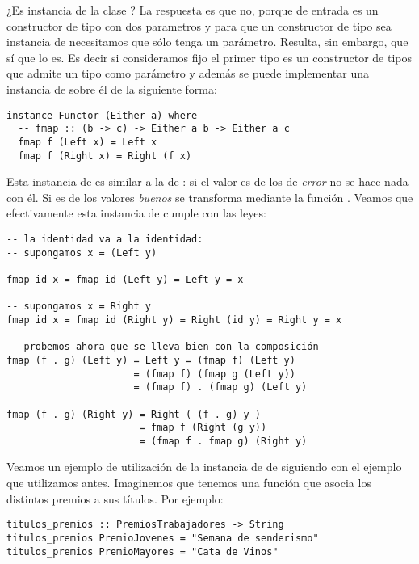 ¿Es  instancia de la clase ?
La respuesta es que no, porque de entrada
 es un constructor de tipo con dos parametros y para que
un constructor de tipo sea instancia
de  necesitamos que sólo tenga
un parámetro. Resulta, sin embargo, que
 sí que lo es. Es decir si consideramos fijo el primer tipo
 es un constructor de tipos que admite un tipo
como parámetro y además se puede implementar una instancia de
 sobre él de la siguiente forma:

\begin{verbatim}
instance Functor (Either a) where
  -- fmap :: (b -> c) -> Either a b -> Either a c
  fmap f (Left x) = Left x
  fmap f (Right x) = Right (f x)
\end{verbatim}

Esta instancia de  es similar a la de :
si el valor
es de los de \emph{error} no se hace nada con él.
Si es de los valores
\emph{buenos} se transforma mediante la
función . Veamos que efectivamente
esta instancia de  cumple con las leyes:
\begin{verbatim}
-- la identidad va a la identidad:
-- supongamos x = (Left y)

fmap id x = fmap id (Left y) = Left y = x

-- supongamos x = Right y
fmap id x = fmap id (Right y) = Right (id y) = Right y = x

-- probemos ahora que se lleva bien con la composición
fmap (f . g) (Left y) = Left y = (fmap f) (Left y)
                      = (fmap f) (fmap g (Left y))
                      = (fmap f) . (fmap g) (Left y)

fmap (f . g) (Right y) = Right ( (f . g) y )
                       = fmap f (Right (g y))
                       = (fmap f . fmap g) (Right y)
\end{verbatim}

Veamos un ejemplo de utilización de la instancia de  de
 siguiendo con el ejemplo que utilizamos antes. Imaginemos
que tenemos una función que asocia los distintos premios a sus títulos.
Por ejemplo:

\begin{verbatim}
titulos_premios :: PremiosTrabajadores -> String
titulos_premios PremioJovenes = "Semana de senderismo"
titulos_premios PremioMayores = "Cata de Vinos"
\end{verbatim}

